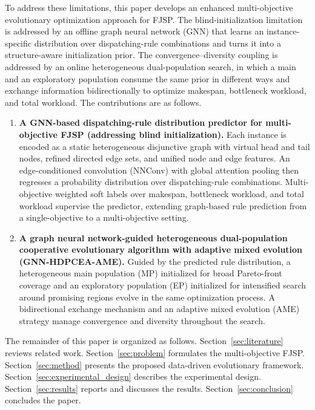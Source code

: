 \documentclass[pdflatex,iicol,Numbered,sn-basic]{sn-jnl}
\begin{document}
To address these limitations, this paper develops an enhanced multi-objective evolutionary optimization approach for FJSP. The blind-initialization limitation is addressed by an offline graph neural network (GNN) that learns an instance-specific distribution over dispatching-rule combinations and turns it into a structure-aware initialization prior.
The convergence--diversity coupling is addressed by an online heterogeneous dual-population search, in which a main and an exploratory population consume the same prior in different ways and exchange information bidirectionally to optimize makespan, bottleneck workload, and total workload. The contributions are as follows.

\begin{enumerate}
  \item \textbf{A GNN-based dispatching-rule distribution predictor for multi-objective FJSP (addressing blind initialization).} Each instance is encoded as a static heterogeneous disjunctive graph with virtual head and tail nodes, refined directed edge sets, and unified node and edge features. An edge-conditioned convolution (NNConv) with global attention pooling then regresses a probability distribution over dispatching-rule combinations. Multi-objective weighted soft labels over makespan, bottleneck workload, and total workload supervise the predictor, extending graph-based rule prediction from a single-objective to a multi-objective setting.
  \item \textbf{A graph neural network-guided heterogeneous dual-population cooperative evolutionary algorithm with adaptive mixed evolution (GNN-HDPCEA-AME).} Guided by the predicted rule distribution, a heterogeneous main population (MP) initialized for broad Pareto-front coverage and an exploratory population (EP) initialized for intensified search around promising regions evolve in the same optimization process. A bidirectional exchange mechanism and an adaptive mixed evolution (AME) strategy manage convergence and diversity throughout the search.
\end{enumerate}

The remainder of this paper is organized as follows.
Section~\ref{sec:literature} reviews related work.
Section~\ref{sec:problem} formulates the multi-objective FJSP.
Section~\ref{sec:method} presents the proposed data-driven evolutionary framework.
Section~\ref{sec:experimental_design} describes the experimental design.
Section~\ref{sec:results} reports and discusses the results.
Section~\ref{sec:conclusion} concludes the paper.
\end{document}
